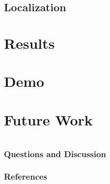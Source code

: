 \documentclass{beamer}
\newcommand{\slide}[2]
{
\begin{frame}
\frametitle{#1} 

#2

\end{frame}
}
\begin{document}
\subsection{Localization}

\section{Results}

\section{Demo}

\section{Future Work}

\section{}

\slide{Questions and Discussion}
{}
\begin{frame}[allowframebreaks]
        \frametitle{References}
        
        
\end{frame}
\end{document}
